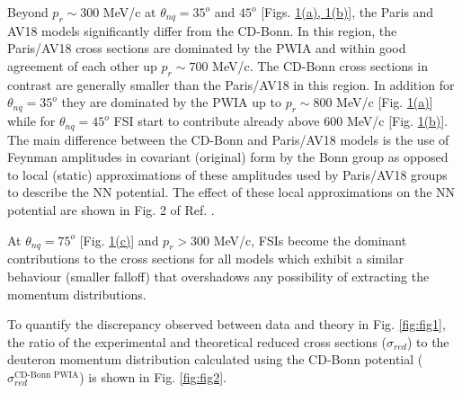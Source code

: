Beyond $p_{r}\sim$300 MeV/c at $\theta_{nq}=35^{o}$ and $45^{o}$ [Figs. \hyperref[fig:fig1]{1(a), 1(b)}], the Paris and
AV18 models significantly differ from the CD-Bonn. In this region, the Paris/AV18 cross sections are dominated by the PWIA and within good agreement of each other up $p_{r}\sim700$ MeV/c. The CD-Bonn cross sections in contrast are generally smaller than the Paris/AV18 in this region.  In addition for $\theta_{nq}=35^{o}$ they are dominated by the PWIA up to $p_{r}\sim800$ MeV/c [Fig. \hyperref[fig:fig1]{1(a)}]  while for $\theta_{nq}=45^{o}$  FSI start to contribute already above 600 MeV/c [Fig. \hyperref[fig:fig1]{1(b)}].
The main difference between the CD-Bonn and Paris/AV18 models is the use of Feynman amplitudes in covariant (original) form by the Bonn group as opposed to local (static) approximations of these amplitudes used by Paris/AV18 groups
to describe the NN potential. The effect of these local approximations on the NN potential are shown in Fig. 2 of Ref. \cite{PhysRevC.63.024001}.

At $\theta_{nq}=75^{o}$ [Fig. \hyperref[fig:fig1]{1(c)}] and $p_{r}>300$ MeV/c, FSIs become the dominant contributions to the cross sections for all models which exhibit a similar behaviour (smaller falloff) 
that overshadows any possibility of extracting the momentum distributions.

To quantify the discrepancy observed between data and theory in Fig. \ref{fig:fig1}, the ratio of the experimental and theoretical reduced cross sections ($\sigma_{red}$) to the deuteron momentum distribution  calculated using the CD-Bonn potential ($\sigma^{\text{CD-Bonn PWIA}}_{red}$)\cite{PhysRevC.63.024001} is shown in Fig. \ref{fig:fig2}.

